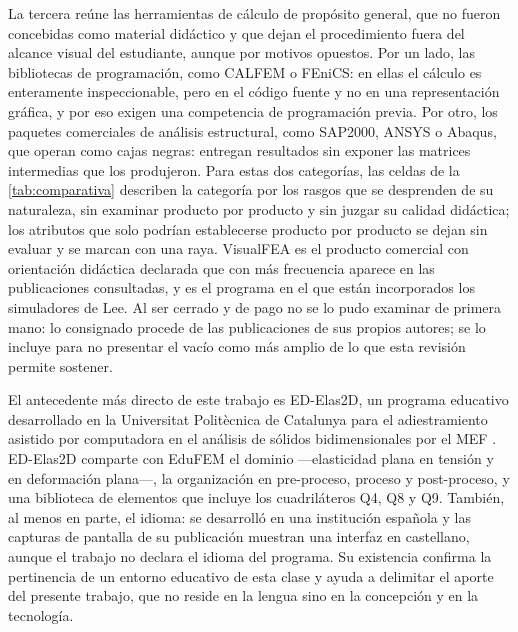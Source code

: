 La tercera reúne las herramientas de cálculo de propósito general, que no fueron concebidas como material didáctico y que dejan el procedimiento fuera del alcance visual del estudiante, aunque por motivos opuestos. Por un lado, las bibliotecas de programación, como CALFEM o FEniCS: en ellas el cálculo es enteramente inspeccionable, pero en el código fuente y no en una representación gráfica, y por eso exigen una competencia de programación previa. Por otro, los paquetes comerciales de análisis estructural, como SAP2000, ANSYS o Abaqus, que operan como cajas negras: entregan resultados sin exponer las matrices intermedias que los produjeron. Para estas dos categorías, las celdas de la \autoref{tab:comparativa} describen la categoría por los rasgos que se desprenden de su naturaleza, sin examinar producto por producto y sin juzgar su calidad didáctica; los atributos que solo podrían establecerse producto por producto se dejan sin evaluar y se marcan con una raya. VisualFEA es el producto comercial con orientación didáctica declarada que con más frecuencia aparece en las publicaciones consultadas, y es el programa en el que están incorporados los simuladores de Lee. Al ser cerrado y de pago no se lo pudo examinar de primera mano: lo consignado procede de las publicaciones de sus propios autores; se lo incluye para no presentar el vacío como más amplio de lo que esta revisión permite sostener.

El antecedente más directo de este trabajo es ED-Elas2D, un programa educativo desarrollado en la Universitat Politècnica de Catalunya para el adiestramiento asistido por computadora en el análisis de sólidos bidimensionales por el MEF \autocite{suarez1998edelas2d}. ED-Elas2D comparte con EduFEM el dominio —elasticidad plana en tensión y en deformación plana—, la organización en pre-proceso, proceso y post-proceso, y una biblioteca de elementos que incluye los cuadriláteros Q4, Q8 y Q9. También, al menos en parte, el idioma: se desarrolló en una institución española y las capturas de pantalla de su publicación muestran una interfaz en castellano, aunque el trabajo no declara el idioma del programa. Su existencia confirma la pertinencia de un entorno educativo de esta clase y ayuda a delimitar el aporte del presente trabajo, que no reside en la lengua sino en la concepción y en la tecnología.

